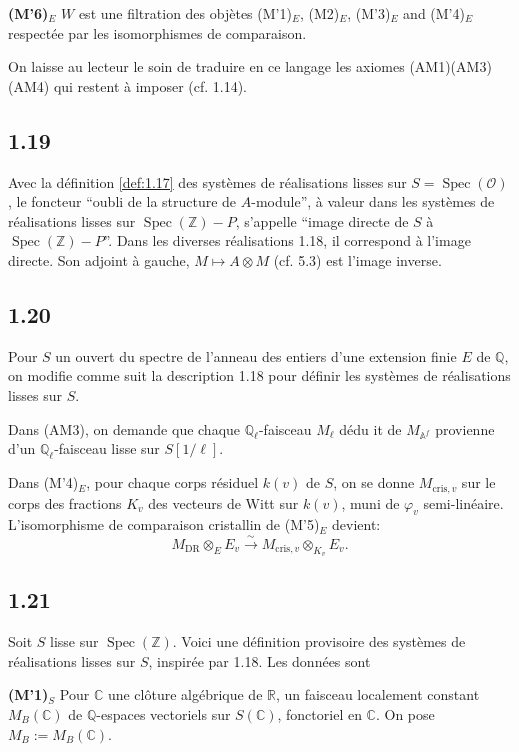 \documentclass[12pt,a4paper]{article}
\theoremstyle{plain}
\theoremstyle{definition}
\theoremstyle{remark}
\DeclareMathOperator{\Spec}{Spec}
\providecommand{\Spec}{\operatorname{Spec}}
\providecommand{\DR}{\mathrm{DR}}
\providecommand{\cris}{\mathrm{cris}}
\begin{document}
\textbf{(M'6)$_E$} $W$ est une filtration des obj\`etes (M'1)$_E$, (M2)$_E$,
(M'3)$_E$ and (M'4)$_E$ respect\'ee par les isomorphismes de comparaison.

On laisse au lecteur le soin de traduire en ce langage les axiomes (AM1)(AM3)(AM4)
qui restent \`a imposer (cf. 1.14).

\subsection*{1.19}

Avec la d\'efinition \ref{def:1.17} des syst\`emes de r\'ealisations lisses sur
$S = \Spec(\mathcal{O})$, le foncteur ``oubli de la structure de $A$-module'', \`a
valeur dans les syst\`emes de r\'ealisations lisses sur $\Spec(\mathbb{Z}) - P$, s'appelle
``image directe de $S$ \`a $\Spec(\mathbb{Z}) - P$''. Dans les diverses r\'ealisations
1.18, il correspond \`a l'image directe. Son adjoint \`a gauche, $M \mapsto A \otimes M$
(cf. 5.3) est l'image inverse.

\subsection*{1.20}

Pour $S$ un ouvert du spectre de l'anneau des entiers d'une extension finie $E$ de
$\mathbb{Q}$, on modifie comme suit la description 1.18 pour d\'efinir les syst\`emes de
r\'ealisations lisses sur $S$.

Dans (AM3), on demande que chaque $\mathbb{Q}_\ell$-faisceau $M_\ell$ d\'edu it de
$M_{\mathbb{A}^f}$ provienne d'un $\mathbb{Q}_\ell$-faisceau lisse sur $S[1/\ell]$.

Dans (M'4)$_E$, pour chaque corps r\'esiduel $k(v)$ de $S$, on se donne
$M_{\cris,v}$ sur le corps des fractions $K_v$ des vecteurs de Witt sur $k(v)$, muni de
$\varphi_v$ semi-lin\'eaire. L'isomorphisme de comparaison cristallin de (M'5)$_E$
devient:
\[
M_{\DR} \otimes_E E_v \xrightarrow{\sim} M_{\cris,v} \otimes_{K_v} E_v.
\]

\subsection*{1.21}

Soit $S$ lisse sur $\Spec(\mathbb{Z})$. Voici une d\'efinition provisoire des syst\`emes
de r\'ealisations lisses sur $S$, inspir\'ee par 1.18. Les donn\'ees sont

\textbf{(M'1)$_S$} Pour $\mathbb{C}$ une cl\^oture alg\'ebrique de $\mathbb{R}$, un faisceau
localement constant $M_B(\mathbb{C})$ de $\mathbb{Q}$-espaces vectoriels sur
$S(\mathbb{C})$, fonctoriel en $\mathbb{C}$. On pose $M_B := M_B(\mathbb{C})$.
\end{document}
